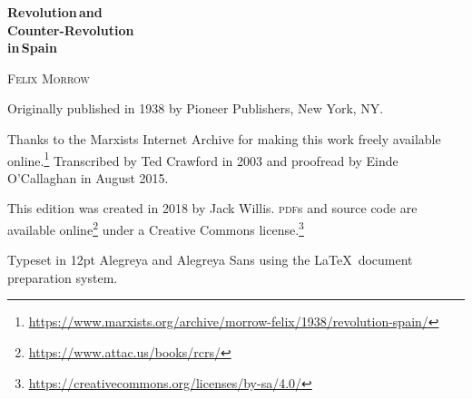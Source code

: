 \begin{titlepage}
	\setlength{\parindent}{0pt}
	
	\vspace*{\fill}
	
	{\sffamily\bfseries\fontsize{40}{40}\selectfont
		Revolution\,\textmd{and} \\
		Counter-Revolution \\
		\textmd{in}\,Spain
		\par}
	
	\vspace{60pt}
	
	{\fontsize{20}{20}\selectfont
		\textsc{Felix Morrow}
		\par}
	
	\vspace*{\fill}
	
\end{titlepage}

{
	\thispagestyle{empty}
	\setlength{\parindent}{0em}
	\setlength{\parskip}{0.5em}
	\sloppy
	
	\vspace*{\fill}
	\vspace*{\fill}
	
	Originally published in 1938 by Pioneer Publishers, New York, NY.
	
	Thanks to the Marxists Internet Archive
	for making this work freely available online.\footnote{\href{https://www.marxists.org/archive/morrow-felix/1938/revolution-spain/}{https://www.marxists.org/archive/morrow-felix/1938/revolution-spain/}}
	Transcribed by Ted Crawford in 2003
	and proofread by Einde O’Callaghan in August 2015.
	
	This edition was created in 2018 by Jack Willis.
	\textsc{pdf}s and source code are available online\footnote{\href{https://www.attac.us/books/rcrs/}{https://www.attac.us/books/rcrs/}}
	under a Creative Commons license.\footnote{\href{https://creativecommons.org/licenses/by-sa/4.0/}{https://creativecommons.org/licenses/by-sa/4.0/}}
	
	Typeset in 12pt Alegreya and {\AlegreyaSans Alegreya Sans} using the \LaTeX\ document preparation system.
	
	\vspace*{\fill}
}